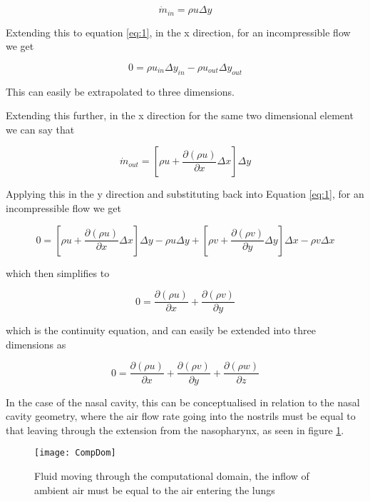     \begin{equation} \label{eq:2}
      \dot{m}_{in} = \rho u \Delta y
     \end{equation}

    Extending this to equation \ref{eq:1}, in the x direction, for an incompressible flow we get

    \begin{equation} \label{eq:3}
      0 = \rho u_{in} \Delta y_{in} - \rho u_{out} \Delta y_{out}
    \end{equation}

    This can easily be extrapolated to three dimensions.


Extending this further, in the x direction for the same two dimensional element we can say that

\begin{equation} \label{eq:22}
\dot{m}_{out} = [\rho u + \frac{\partial(\rho u)}{\partial x}\Delta x]\Delta y
\end{equation}

Applying this in the y direction and substituting back into Equation \ref{eq:1}, for an incompressible flow we get
 
\begin{dmath} \label{eq:23}
0 = [\rho u + \frac{\partial(\rho u)}{\partial x}\Delta x]\Delta y - \rho u \Delta y 
+ [\rho v + \frac{\partial(\rho v)}{\partial y}\Delta y]\Delta x - \rho v \Delta x  
\end{dmath}

which then simplifies to

\begin{equation} \label{eq:24}
  0 = \frac{\partial(\rho u)}{\partial x} + \frac{\partial(\rho v)}{\partial y}
\end{equation}

which is the continuity equation, and can easily be extended into three dimensions as

\begin{equation} \label{eq:25}
  0 = \frac{\partial(\rho u)}{\partial x} + \frac{\partial(\rho v)}{\partial y} + \frac{\partial(\rho w)}{\partial z}
\end{equation}


    In the case of the nasal cavity, this can be conceptualised in relation to the nasal cavity geometry, where the air flow rate going into the nostrils must be equal to that leaving through the extension from the nasopharynx, as seen in figure \ref{fig:CompDom}.

\begin{figure}   
  \centering
  \texttt{[image: CompDom]}
  \caption{Fluid moving through the computational domain, the inflow of ambient air must be equal to the air entering the lungs}
  \label{fig:CompDom}
\end{figure}


